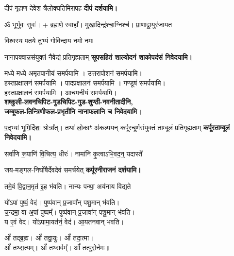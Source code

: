 \begin{center}
{दीपं गृहाण देवेश त्रैलोक्यतिमिरापह}
\textbf{\devAya{} दीपं दर्शयामि।}
\medskip

ॐ भूर्भुवः॒ सुवः॑। + ब्र॒ह्मणे॒ स्वाहा᳚।
{मुखा॒दिन्द्र॑श्चा॒ग्निश्च॑। प्रा॒णाद्वा॒युर॑जायत}


{विश्वस्य पतये तुभ्यं गोविन्दाय नमो नमः}

{नानापक्वान्नसंयुक्तं नैवेद्यं प्रतिगृह्यताम्}
\textbf{\devAya{} सूपसहितं शाल्योदनं शाकोपदंसं निवेदयामि।}

मध्ये मध्ये अमृतपानीयं समर्पयामि । उत्तरापोशनं समर्पयामि।\\
हस्तप्रक्षालनं समर्पयामि । पादप्रक्षालनं समर्पयामि । गण्डूषं समर्पयामि।\\
हस्तप्रक्षालनं समर्पयामि । आचमनीयं समर्पयामि।\\
\textbf{\devAya{} शष्कुली-लवनचिपिट-गुडचिपिट-गुड-शुण्ठी-नवनीतादीनि,\\
जम्बूफल-तिन्त्रिणीफल-प्रभृतीनि नानाफलानि च निवेदयामि।}
\medskip

{प॒द्भ्यां भूमि॒र्दिशः॒ श्रोत्रा᳚त्। तथा॑ लो॒काꣳ अ॑कल्पयन्}
{कर्पूरचूर्णसंयुक्तं ताम्बूलं प्रतिगृह्यताम्}
\textbf{\devAya{} कर्पूरताम्बूलं निवेदयामि।}
\medskip


{सर्वा॑णि रू॒पाणि॑ वि॒चित्य॒ धीरः॑। नामा॑नि कृ॒त्वाऽभि॒वद॒न्॒ यदास्ते᳚}

{जय-मङ्गल-निर्घोषैर्देवदेवं समर्चयेत्}
\textbf{\devAya{} कर्पूरनीराजनं दर्शयामि।}
\medskip

{तमे॒वं वि॒द्वान॒मृत॑ इ॒ह भ॑वति। नान्यः पन्था॒ अय॑नाय विद्यते}

यो॑ऽपां पुष्पं॒ वेद॑। पुष्प॑वान् प्र॒जावा᳚न् पशु॒मान् भ॑वति।\\
च॒न्द्रमा॒ वा अ॒पां पुष्पम्᳚। पुष्प॑वान् प्र॒जावा᳚न् पशु॒मान् भ॑वति।\\
य ए॒वं वेद॑। यो॑ऽपामा॒यत॑नं॒ वेद॑। आ॒यत॑नवान् भवति।\medskip

ओं᳚ तद्ब्र॒ह्म। ओं᳚ तद्वा॒युः। ओं᳚ तदा॒त्मा।\\ ओं᳚ तथ्स॒त्यम्।
ओं᳚ तथ्सर्वम्᳚। ओं᳚ तत्पुरो॒र्नमः॥\medskip


\end{center}
